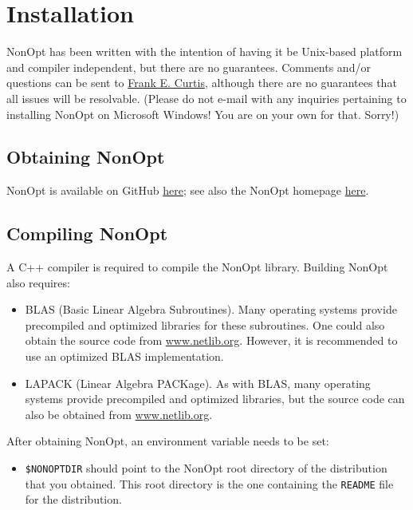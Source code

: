 \documentclass{article}
\begin{document}
\section{Installation}

NonOpt has been written with the intention of having it be Unix-based platform and compiler independent, but there are no guarantees.  Comments and/or questions can be sent to \href{mailto:frank.e.curtis@gmail.com}{Frank E. Curtis}, although there are no guarantees that all issues will be resolvable. (Please do not e-mail with any inquiries pertaining to installing NonOpt on Microsoft Windows! You are on your own for that. Sorry!)

\subsection{Obtaining NonOpt}

NonOpt is available on GitHub \href{https://github.com/frankecurtis/NonOpt}{here}; see also the NonOpt homepage \href{https://sufficientdescent.github.io/nonopt}{here}.

\subsection{Compiling NonOpt}

A C++ compiler is required to compile the NonOpt library. Building NonOpt also requires:

\begin{itemize}
  \item BLAS (Basic Linear Algebra Subroutines). Many operating systems provide precompiled and optimized
libraries for these subroutines.  One could also obtain the source code from \href{www.netlib.org}{www.netlib.org}.  However, it is recommended to use an optimized BLAS implementation.
  \item LAPACK (Linear Algebra PACKage).  As with BLAS, many operating systems provide precompiled and optimized libraries, but the source code can also be obtained from \href{www.netlib.org}{www.netlib.org}.
\end{itemize}

After obtaining NonOpt, an environment variable needs to be set:
\begin{itemize}
  \item \texttt{\$NONOPTDIR} should point to the NonOpt root directory of the distribution that you obtained. This root directory is the one containing the \texttt{README} file for the distribution.
\end{itemize}
\end{document}
